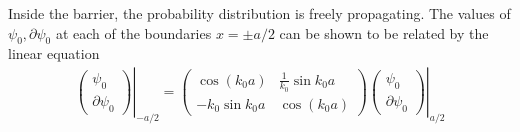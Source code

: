 \documentclass[aps,pre,floats,floatfix,fleqn,notitlepage]{revtex4-1}
\newcommand{\beq}{\begin{eqnarray}}
\newcommand{\eeq}{\end{eqnarray}}
\begin{document}
Inside the barrier, the probability distribution is freely propagating. The values of $\psi_0,\partial\psi_0$ at each of the boundaries $x=\pm a/2$ can be shown to be  related by the linear equation
%
\beq
\left.\left( \begin{array}{c}
\psi_0 \\
\partial \psi_0
\end{array}
\right)\right|_{-a/2} = 
\left( \begin{array}{cc}
\cos(k_0a) & \frac{1}{k_0} \sin{k_0a} \\
-k_0 \sin{k_0a} & \cos(k_0a)
\end{array}
\right)
\left.\left( \begin{array}{c}
\psi_0 \\
\partial \psi_0
\end{array}
\right)\right|_{a/2} 
\eeq
%
\end{document}
